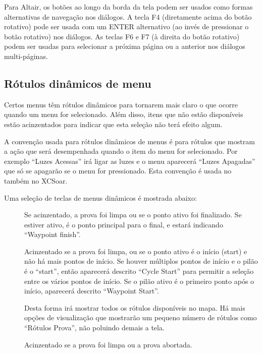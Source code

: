 Para Altair, os botões ao longo da borda da tela podem ser usados como formas alternativas de navegação nos diálogos.  A tecla F4 (diretamente acima do botão rotativo) pode ser usada com um ENTER alternativo (ao invés de pressionar o botão rotativo) nos diálogos.  As teclas F6 e F7 (à direita do botão rotativo) podem ser usadas para selecionar a próxima página ou a anterior nos diálogos multi-páginas.

\subsection*{Rótulos dinâmicos de menu}
Certos menus têm rótulos dinâmicos para tornarem mais claro o que ocorre quando um menu for selecionado.  Além disso, itens que não estão disponíveis estão acinzentados para indicar que esta seleção não terá efeito algum.

A convenção usada para rótulos dinâmicos de menus é para rótulos que mostram a ação que será desempenhada quando o item do menu for selecionado.  Por exemplo “Luzes Acessas” irá ligar as luzes e o menu aparecerá “Luzes Apagadas” que só se apagarão se o menu for pressionado.  Esta convenção é usada no também no XCSoar.

Uma seleção de teclas de menus dinâmicos é mostrada abaixo:

\begin{description}
\item[]  
 Se acinzentado, a prova foi limpa ou se o ponto ativo foi finalizado.  Se estiver ativo, é o ponto principal para o final, e estará indicando “Waypoint finish”.
\item[]  
  Acinzentado se a prova foi limpa, ou se o ponto ativo é o início (start) e não há mais pontos de início.  Se houver múltiplos pontos de início e o pilão é o “start”, então aparecerá descrito “Cycle Start” para permitir a seleção entre os vários pontos de início.  Se o pilão ativo é o primeiro ponto após o início, aparecerá descrito “Waypoint Start”. 
\item[]  
 Desta forma irá mostrar todos os rótulos disponíveis no mapa.  Há mais opções de visualização que mostrarão um pequeno número de rótulos como “Rótulos Prova”, não poluindo demais a tela.
\item[]  
  Acinzentado se a prova foi limpa ou a prova abortada.

\end{description}


